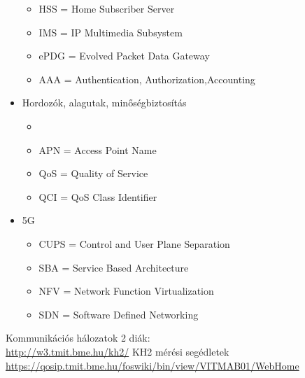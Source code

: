 \documentclass[10pt,a4paper]{article}
\begin{document}
\begin{multicols}{2}
\begin{itemize}
\begin{itemize}
\item HSS = Home Subscriber Server
\item IMS = IP Multimedia Subsystem
\item ePDG = Evolved Packet Data Gateway
\item AAA = Authentication, Authorization,Accounting
\end{itemize}
\item Hordozók, alagutak, minőségbiztosítás
\begin{itemize}
	\item \item APN = Access Point Name
\item QoS = Quality of Service
\item QCI = QoS Class Identifier
\end{itemize}
\item 5G
\begin{itemize}
	\item CUPS = Control and User Plane Separation
\item SBA = Service Based Architecture
\item NFV = Network Function Virtualization
\item SDN = Software Defined Networking
\end{itemize}
\end{itemize}
\end{multicols}
\begin{thebibliography}{9}
	Kommunikációs hálozatok 2 diák:\\
	\url{http://w3.tmit.bme.hu/kh2/}
	KH2 mérési segédletek\\
	\url{https://qosip.tmit.bme.hu/foswiki/bin/view/VITMAB01/WebHome}
\end{thebibliography}
\end{document}
